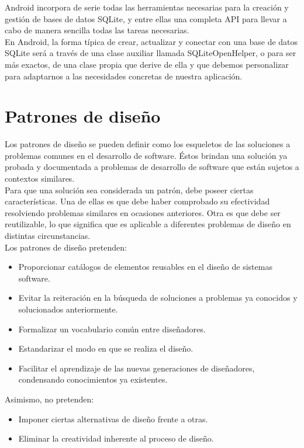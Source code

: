 Android incorpora de serie todas las herramientas necesarias para la creación y gestión de bases de datos SQLite, y entre ellas una completa API para llevar a cabo de manera sencilla todas las tareas necesarias.\\

En Android, la forma típica de crear, actualizar y conectar con una base de datos SQLite será a través de una clase auxiliar llamada SQLiteOpenHelper, o para ser más exactos, de una clase propia que derive de ella y que debemos personalizar para adaptarnos a las necesidades concretas de nuestra aplicación.

\section{Patrones de diseño}

Los patrones de diseño se pueden definir como los esqueletos de las soluciones a problemas comunes en el desarrollo de software. Éstos brindan una solución ya probada y documentada a problemas de desarrollo de software que están sujetos a contextos similares.\\

Para que una solución sea considerada un patrón, debe poseer ciertas características. Una de ellas es que debe haber comprobado su efectividad resolviendo problemas similares en ocasiones anteriores. Otra es que debe ser reutilizable, lo que significa que es aplicable a diferentes problemas de diseño en distintas circunstancias.\\

Los patrones de diseño pretenden:

\begin{itemize}
\item Proporcionar catálogos de elementos reusables en el diseño de sistemas software.
\item Evitar la reiteración en la búsqueda de soluciones a problemas ya conocidos y solucionados anteriormente.
\item Formalizar un vocabulario común entre diseñadores.
\item Estandarizar el modo en que se realiza el diseño.
\item Facilitar el aprendizaje de las nuevas generaciones de diseñadores, condensando conocimientos ya existentes.
\end{itemize}

Asimismo, no pretenden:

\begin{itemize}
\item Imponer ciertas alternativas de diseño frente a otras.
\item Eliminar la creatividad inherente al proceso de diseño.
\end{itemize}

